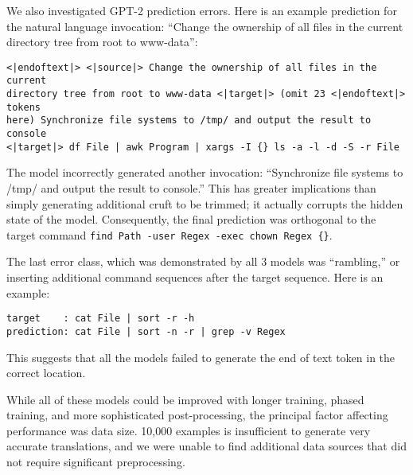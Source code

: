 \par
We also investigated GPT-2 prediction errors. Here is an example prediction for the natural language invocation: ``Change the ownership of all files in the current directory tree from root to www-data'':

\begin{verbatim}
<|endoftext|> <|source|> Change the ownership of all files in the current 
directory tree from root to www-data <|target|> (omit 23 <|endoftext|> tokens 
here) Synchronize file systems to /tmp/ and output the result to console 
<|target|> df File | awk Program | xargs -I {} ls -a -l -d -S -r File
\end{verbatim}
The model incorrectly generated another invocation: ``Synchronize file systems to /tmp/ and output the result to console.'' This has greater implications than simply generating additional cruft to be trimmed; it actually corrupts the hidden state of the model. Consequently, the final prediction was orthogonal to the target command \texttt{find Path -user Regex -exec chown Regex \{\}}.
\par
The last error class, which was demonstrated by all 3 models was ``rambling,'' or inserting additional command sequences after the target sequence. Here is an example:
\begin{verbatim}
target    : cat File | sort -r -h 
prediction: cat File | sort -n -r | grep -v Regex
\end{verbatim}
This suggests that all the models failed to generate the end of text token in the correct location.
\par
While all of these models could be improved with longer training, phased training, and more sophisticated post-processing, the principal factor affecting performance was data size. 10,000 examples is insufficient to generate very accurate translations, and we were unable to find additional data sources that did not require significant preprocessing.
